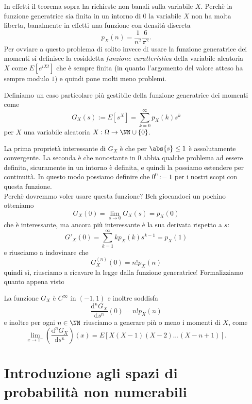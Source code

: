\documentclass[11pt]{scrartcl}
\newcommand{\dif}{\text{d}}
\begin{document}
	In effetti il teorema sopra ha richieste non banali sulla variabile $X$. Perchè la funzione generatrice sia finita in un intorno di $0$ la variabile $X$ non ha molta liberta, banalmente in effetti una funzione con densità discreta
	$$p_X(n)=\frac{1}{n^2}\frac{6}{\pi^2}.$$
	Per ovviare a questo problema di solito invece di usare la funzione generatrice dei momenti si definisce la cosiddetta \textit{funzione caratteristica} della variabile aleatoria $X$ come $E\left[e^{iXt}\right]$ che è sempre finita (in quanto l'argomento del valore atteso ha sempre modulo $1$) e quindi pone molti meno problemi.
	\begin{definition}
		Definiamo un caso particolare più gestibile della funzione generatrice dei momenti come
		$$G_X(s):=E\left[s^X\right]=\sum_{k=0}^{\infty}p_X(k)s^k$$
		per $X$ una variabile aleatoria $X:\Omega\to \NN\cup\left\{0\right\}$.
	\end{definition}
	La prima proprietà interessante di $G_X$ è che per $\abs{s}\le 1$ è assolutamente convergente. La seconda è che nonostante in $0$ abbia qualche problema ad essere definita, sicuramente in un intorno è definita, e quindi la possiamo estendere per continuità. In questo modo possiamo definire che $0^0:=1$ per i nostri scopi con questa funzione. \\
	Perchè dovremmo voler usare questa funzione? Beh giocandoci un pochino otteniamo
	$$G_X(0)=\lim_{s\to 0 }G_X(s)=p_X(0)$$
	che è interessante, ma ancora più interessante è la sua derivata rispetto a $s$:
	$$G'_X(0)=\sum_{k=1}^{\infty}k p_X(k)s^{k-1}=p_X(1)$$
	e riusciamo a indovinare che 
	$$G^{(n)}_X(0)=n!p_X(n)$$
	quindi sì, riusciamo a ricavare la legge dalla funzione generatrice! Formalizziamo quanto appena visto
	\begin{theorem}
		La funzione $G_X$ è $C^\infty$ in $(-1,1)$ e inoltre soddisfa
		$$\frac{\dif^n G_X}{\dif s^n}(0)=n!p_X(n)$$
		e inoltre per ogni $n\in \NN$ riusciamo a generare più o meno i momenti di $X$, come
		$$\lim_{x\to 1^{-}}\left(\frac{\dif^n G_X}{\dif s^n}\right)(x)=E\left[X(X-1)(X-2)\dots (X-n+1)\right].$$
	\end{theorem}
	
	\newpage
	
	\section{Introduzione agli spazi di probabilità non numerabili}
	
\end{document}
